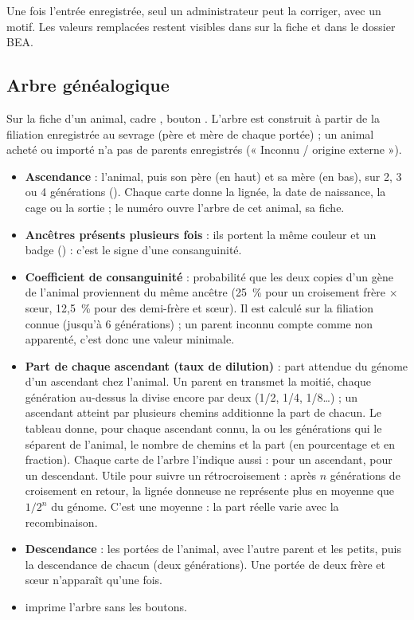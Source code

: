 \documentclass[11pt,a4paper]{article}
\begin{document}
\begin{trace}
Une fois l'entrée enregistrée, seul un administrateur peut la corriger, avec
un motif. Les valeurs remplacées restent visibles dans  sur la fiche et dans le dossier BEA.
\end{trace}

\subsection{Arbre généalogique}\label{sec:arbre}
Sur la fiche d'un animal, cadre , bouton . L'arbre est construit à partir de la filiation enregistrée au
sevrage (père et mère de chaque portée) ; un animal acheté ou importé n'a pas
de parents enregistrés (« Inconnu / origine externe »).
\begin{itemize}
  \item \textbf{Ascendance} : l'animal, puis son père (en haut) et sa mère
    (en bas), sur 2, 3 ou 4 générations (). Chaque carte
    donne la lignée, la date de naissance, la cage ou la sortie ; le numéro
    ouvre l'arbre de cet animal,  sa fiche.
  \item \textbf{Ancêtres présents plusieurs fois} : ils portent la même
    couleur et un badge () : c'est le signe d'une consanguinité.
  \item \textbf{Coefficient de consanguinité} : probabilité que les deux
    copies d'un gène de l'animal proviennent du même ancêtre (25~\% pour un
    croisement frère × sœur, 12,5~\% pour des demi-frère et sœur). Il est
    calculé sur la filiation connue (jusqu'à 6 générations) ; un parent
    inconnu compte comme non apparenté, c'est donc une valeur minimale.
  \item \textbf{Part de chaque ascendant (taux de dilution)} : part
    attendue du génome d'un ascendant chez l'animal. Un parent en transmet
    la moitié, chaque génération au-dessus la divise encore par deux (1/2,
    1/4, 1/8…) ; un ascendant atteint par plusieurs chemins additionne la
    part de chacun. Le tableau donne, pour chaque ascendant connu, la ou les
    générations qui le séparent de l'animal, le nombre de chemins et la part
    (en pourcentage et en fraction). Chaque carte de l'arbre l'indique aussi :
     pour un ascendant,  pour un descendant.
    Utile pour suivre un rétrocroisement : après $n$ générations de
    croisement en retour, la lignée donneuse ne représente plus en moyenne
    que $1/2^n$ du génome. C'est une moyenne : la part réelle varie avec la
    recombinaison.
  \item \textbf{Descendance} : les portées de l'animal, avec l'autre parent
    et les petits, puis la descendance de chacun (deux générations). Une
    portée de deux frère et sœur n'apparaît qu'une fois.
  \item {} imprime l'arbre sans les boutons.
\end{itemize}
\end{document}
